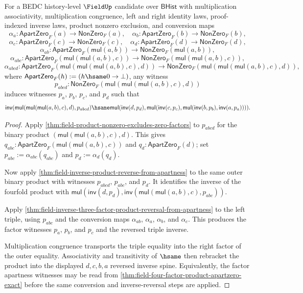 \begin{theorem}
\label{thm:field-inverse-four-factor-product-reversal-from-apartness}
For a BEDC history-level $\FieldUp$ candidate over $\mathsf{BHist}$ with
multiplication associativity, multiplication congruence, left and right
identity laws, proof-indexed inverse laws, product nonzero exclusion, and
conversion maps
$$
\alpha_a:\mathsf{ApartZero}_F(a)\to\mathsf{NonZero}_F(a),\quad
\alpha_b:\mathsf{ApartZero}_F(b)\to\mathsf{NonZero}_F(b),
$$
$$
\alpha_c:\mathsf{ApartZero}_F(c)\to\mathsf{NonZero}_F(c),\quad
\alpha_d:\mathsf{ApartZero}_F(d)\to\mathsf{NonZero}_F(d),
$$
$$
\alpha_{ab}:\mathsf{ApartZero}_F(\mathsf{mul}(a,b))\to
\mathsf{NonZero}_F(\mathsf{mul}(a,b)),
$$
$$
\alpha_{abc}:\mathsf{ApartZero}_F(\mathsf{mul}(\mathsf{mul}(a,b),c))\to
\mathsf{NonZero}_F(\mathsf{mul}(\mathsf{mul}(a,b),c)),
$$
$$
\alpha_{abcd}:
\mathsf{ApartZero}_F(\mathsf{mul}(\mathsf{mul}(\mathsf{mul}(a,b),c),d))\to
\mathsf{NonZero}_F(\mathsf{mul}(\mathsf{mul}(\mathsf{mul}(a,b),c),d)),
$$
where $\mathsf{ApartZero}_F(h):=(h\hsame0\to\bot)$, any witness
$$
p_{abcd}:
\mathsf{NonZero}_F(\mathsf{mul}(\mathsf{mul}(\mathsf{mul}(a,b),c),d))
$$
induces witnesses $p_a$, $p_b$, $p_c$, and $p_d$ such that
$$
\mathsf{inv}(\mathsf{mul}(\mathsf{mul}(\mathsf{mul}(a,b),c),d),p_{abcd})
\hsame
\mathsf{mul}(\mathsf{inv}(d,p_d),
\mathsf{mul}(\mathsf{inv}(c,p_c),
\mathsf{mul}(\mathsf{inv}(b,p_b),\mathsf{inv}(a,p_a)))).
$$
\end{theorem}
\begin{proof}
Apply \autoref{thm:field-product-nonzero-excludes-zero-factors} to
$p_{abcd}$ for the binary product
$(\mathsf{mul}(\mathsf{mul}(a,b),c),d)$. This gives
$q_{abc}:\mathsf{ApartZero}_F(\mathsf{mul}(\mathsf{mul}(a,b),c))$ and
$q_d:\mathsf{ApartZero}_F(d)$; set $p_{abc}:=\alpha_{abc}(q_{abc})$ and
$p_d:=\alpha_d(q_d)$.

Now apply
\autoref{thm:field-inverse-product-reverse-from-apartness} to the same outer
binary product with witnesses $p_{abcd}$, $p_{abc}$, and $p_d$. It identifies
the inverse of the fourfold product with
$\mathsf{mul}(\mathsf{inv}(d,p_d),
\mathsf{inv}(\mathsf{mul}(\mathsf{mul}(a,b),c),p_{abc}))$.

Apply \autoref{thm:field-inverse-three-factor-product-reversal-from-apartness}
to the left triple, using $p_{abc}$ and the conversion maps
$\alpha_{ab}$, $\alpha_a$, $\alpha_b$, and $\alpha_c$. This produces the
factor witnesses $p_a$, $p_b$, and $p_c$ and the reversed triple inverse.

Multiplication congruence transports the triple equality into the right factor
of the outer equality. Associativity and transitivity of $\hsame$ then rebracket
the product into the displayed
$d,c,b,a$ reversed inverse spine. Equivalently, the factor apartness witnesses
may be read from \autoref{thm:field-four-factor-product-apartzero-exact} before
the same conversion and inverse-reversal steps are applied.
\end{proof}

